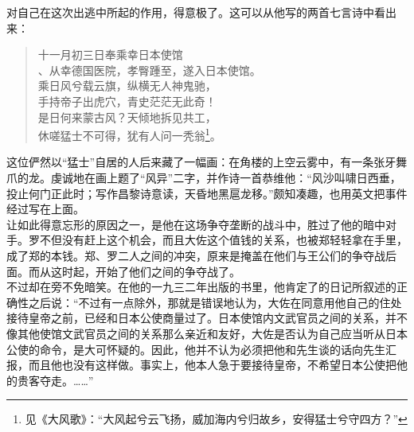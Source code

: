 对自己在这次出逃中所起的作用，得意极了。这可以从他写的两首七言诗中看出来：\\

\begin{quote}
	十一月初三日奉乘幸日本使馆\\

、从幸德国医院，孝臀踵至，遂入日本使馆。\\

乘日风兮载云旗，纵横无人神鬼驰，\\

手持帝子出虎穴，青史茫茫无此奇！\\

是日何来蒙古风？天倾地拆见共工，\\

休嗟猛士不可得，犹有人问一秃翁\footnote{见《大风歌》：“大风起兮云飞扬，威加海内兮归故乡，安得猛士兮守四方？”}。\\
\end{quote}

这位俨然以“猛士”自居的人后来藏了一幅画：在角楼的上空云雾中，有一条张牙舞爪的龙。虔诚地在画上题了“风异”二字，并作诗一首恭维他：“风沙叫啸日西垂，投止何门正此时；写作昌黎诗意读，天昏地黑扈龙移。”颇知凑趣，也用英文把事件经过写在上面。\\

让如此得意忘形的原因之一，是他在这场争夺垄断的战斗中，胜过了他的暗中对手。罗不但没有赶上这个机会，而且大佐这个值钱的关系，也被郑轻轻拿在手里，成了郑的本钱。郑、罗二人之间的冲突，原来是掩盖在他们与王公们的争夺战后面。而从这时起，开始了他们之间的争夺战了。\\

不过却在旁不免暗笑。在他的一九三二年出版的书里，他肯定了的日记所叙述的正确性之后说：“不过有一点除外，那就是错误地认为，大佐在同意用他自己的住处接待皇帝之前，已经和日本公使商量过了。日本使馆内文武官员之间的关系，并不像其他使馆文武官员之间的关系那么亲近和友好，大佐是否认为自己应当听从日本公使的命令，是大可怀疑的。因此，他并不认为必须把他和先生谈的话向先生汇报，而且他也没有这样做。事实上，他本人急于要接待皇帝，不希望日本公使把他的贵客夺走。……”\\

